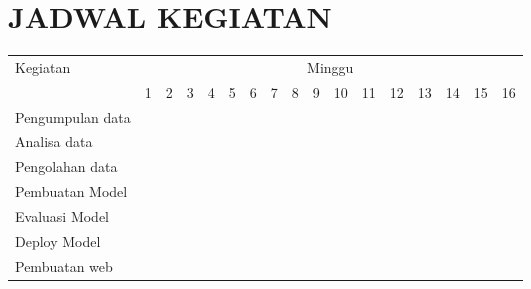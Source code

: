 \chapter*{JADWAL KEGIATAN}
\newcommand{\w}{}
\newcommand{\G}{\cellcolor{gray}}
\begin{table}[h!]
    \begin{tabular}{|p{3.5cm}|c|c|c|c|c|c|c|c|c|c|c|c|c|c|c|c|}

        \hline
        \multirow{2}{*}{Kegiatan} & \multicolumn{16}{|c|}{Minggu}                                                                       \\
        \cline{2-17}              &
        1                         & 2                             & 3  & 4  & 5  & 6  & 7  & 8  & 9  & 10 & 11 & 12 & 13 & 14 & 15 & 16 \\
        \hline

        Pengumpulan data          &
        \G                        & \G                            & \G & \G & \w & \w & \w & \w & \w & \w & \w & \w & \w & \w & \w & \w \\
        \hline

        Analisa data              &
        \w                        & \w                            & \w & \w & \G & \G & \w & \w & \w & \w & \w & \w & \w & \w & \w & \w \\
        \hline

        Pengolahan data           &
        \w                        & \w                            & \w & \w & \w & \G & \G & \w & \w & \w & \w & \w & \w & \w & \w & \w \\
        \hline

        Pembuatan Model           &
        \w                        & \w                            & \w & \w & \w & \w & \w & \G & \G & \G & \G & \w & \w & \w & \w & \w \\
        \hline

        Evaluasi Model            &
        \w                        & \w                            & \w & \w & \w & \w & \w & \w & \w & \w & \G & \G & \G & \G & \w & \w \\
        \hline

        Deploy Model              &
        \w                        & \w                            & \w & \w & \w & \w & \w & \w & \w & \w & \w & \w & \w & \G & \G & \w \\
        \hline

        Pembuatan web             &
        \w                        & \w                            & \w & \w & \w & \w & \w & \w & \w & \w & \w & \w & \w & \w & \G & \G \\
        \hline
    \end{tabular}
\end{table}